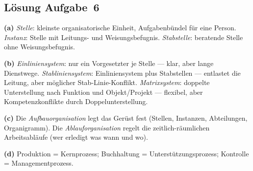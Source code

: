 \documentclass[11pt, a4paper]{article}
\begin{document}
\subsection*{Lösung Aufgabe~6}
\begin{loesung}
\textbf{(a)} \emph{Stelle}: kleinste organisatorische Einheit, Aufgabenbündel für eine
Person. \emph{Instanz}: Stelle mit Leitungs- und Weisungsbefugnis. \emph{Stabstelle}:
beratende Stelle ohne Weisungsbefugnis.

\textbf{(b)} \emph{Einliniensystem}: nur ein Vorgesetzter je Stelle --- klar, aber lange
Dienstwege. \emph{Stabliniensystem}: Einliniensystem plus Stabstellen --- entlastet die
Leitung, aber möglicher Stab-Linie-Konflikt. \emph{Matrixsystem}: doppelte Unterstellung
nach Funktion und Objekt/Projekt --- flexibel, aber Kompetenzkonflikte durch
Doppelunterstellung.

\textbf{(c)} Die \emph{Aufbauorganisation} legt das Gerüst fest (Stellen, Instanzen,
Abteilungen, Organigramm). Die \emph{Ablauforganisation} regelt die zeitlich-räumlichen
Arbeitsabläufe (wer erledigt was wann und wo).

\textbf{(d)} Produktion = Kernprozess; Buchhaltung = Unterstützungsprozess; Kontrolle =
Managementprozess.
\end{loesung}
\end{document}
